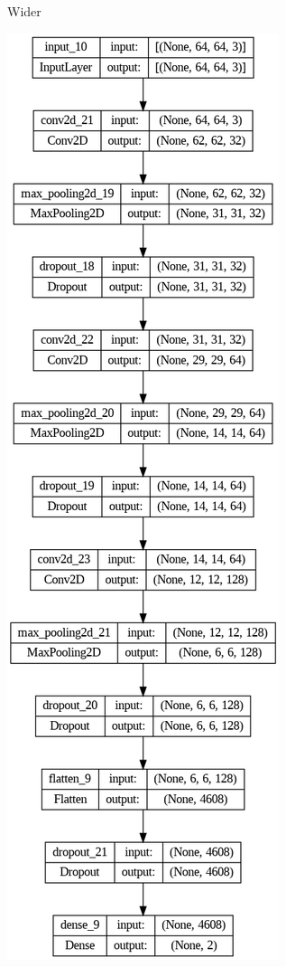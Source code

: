 \documentclass{thesisreport}
\begin{document}
\begin{figure}[h]
\begin{subfigure}[b]{0.2\linewidth}
    \caption{Wider}
  \end{subfigure}
  \begin{subfigure}[b]{0.2\linewidth}
    \includegraphics[width=\linewidth]{figures/model_deeper.png}

\end{subfigure}
\end{figure}
\end{document}
